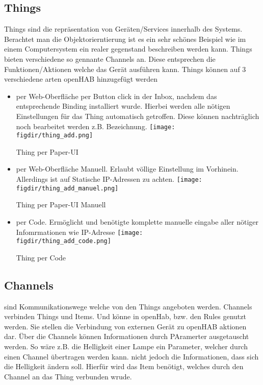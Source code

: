 \subsection{Things}
Things sind die repräsentation von Geräten/Services innerhalb des Systems. Berachtet man die Objektorierntierung ist es ein sehr schönes Beispiel wie im einem Computersystem ein realer gegenstand beschreiben werden kann.
Things bieten verschiedene so gennante Channels an. Diese entsprechen die Funktionen/Aktionen welche das Gerät ausführen kann.
Things können auf 3 verschiedene arten openHAB hinzugefügt werden
\begin{itemize}
	\item per Web-Oberfläche per Button click in der Inbox, nachdem das entsprechende Binding installiert wurde. Hierbei werden alle nötigen Einstellungen für das Thing automatisch getroffen. Diese können nachträglich noch bearbeitet werden z.B. Bezeichnung. 
		\captionsetup{type=figure}
		\texttt{[image: \\figdir/thing\_add.png]}
		\caption{Thing per Paper-UI \label{fig:thing-add-paper-ui}}
		
	\item per Web-Oberfläche Manuell. Erlaubt völlige Einstellung im Vorhinein. Allerdings ist auf Statische IP-Adressen zu achten.
		\captionsetup{type=figure}
		\texttt{[image: \\figdir/thing\_add\_manuel.png]}
		\caption{Thing per Paper-UI Manuell \label{fig:thing-add-paper-ui-manuel}}
		
	\item per Code. Ermöglicht und benötigte komplette manuelle eingabe aller nötiger Infomrmationen wie IP-Adresse
		\captionsetup{type=figure}
		\texttt{[image: \\figdir/thing\_add\_code.png]}
		\caption{Thing per Code \label{fig:thing-add-code}}
\end{itemize}

\subsection{Channels}
sind Kommunikationswege welche von den Things angeboten werden. Channels verbinden Things und Items. Und könne in openHab, bzw. den Rules genutzt werden. Sie stellen die Verbindung von externen Gerät zu openHAB aktionen dar. Über die Channels können Informationen durch PAramerter ausgetauscht werden. So wäre z.B. die Helligkeit einer Lampe ein Parameter, welcher durch einen Channel übertragen werden kann. nicht jedoch die Informationen, dass sich die Helligkeit ändern soll. Hierfür wird das Item benötigt, welches durch den Channel an das Thing verbunden wrude.

